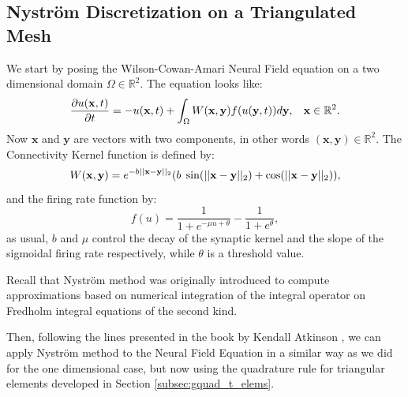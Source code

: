 \documentclass{uonmathreport}
\begin{document}
\subsection{Nystr\"om Discretization on a Triangulated Mesh}
\label{subsec:tri nystrom discretize}

We start by posing the Wilson-Cowan-Amari Neural Field equation on a two dimensional domain $\Omega \in \mathbb{R}^2$. The equation looks like:
\begin{equation} \label{eqn:2d_tri_nf_gral}
\frac{\partial u(\mathbf{x},t)}{\partial t} = - u(\mathbf{x},t) + \int_{\Omega} W(\mathbf{x},\mathbf{y})f(u(\mathbf{y}, t)) d\mathbf{y}, \hspace{3mm} \mathbf{x} \in \mathbb{R}^2.
\end{equation}
Now $\mathbf{x}$ and $\mathbf{y}$ are vectors with two components, in other words $(\mathbf{x}, \mathbf{y}) \in \mathbb{R}^2$.
The Connectivity Kernel function is defined by:
\begin{equation}\label{eqn:2d_tri_kernel}
W(\mathbf{x},\mathbf{y})  = e^{-b||\mathbf{x}-\mathbf{y}||_2}(b\hspace{1mm} \sin(||\mathbf{x}-\mathbf{y}||_2) + \cos(||\mathbf{x}-\mathbf{y}||_2)),
\end{equation}
and the firing rate function by:
\begin{equation}\label{eqn:2d_tri_frate}
f(u) = \frac{1}{1+e^{-\mu u + \theta}} -\frac{1}{1+e^\theta},
\end{equation}
as usual, $b$ and $\mu$ control the decay of the synaptic kernel and the slope of the sigmoidal firing rate respectively, while $\theta$ is a threshold value. 

Recall that Nystr\"om method was originally introduced to compute approximations based on numerical integration of the integral operator on Fredholm integral equations of the second kind.

Then, following the lines presented in the book by Kendall Atkinson \cite{atkinson1976survey}, we can apply Nystr\"om method to the Neural Field Equation in a similar way as we did for the one dimensional case, but now using the quadrature rule for triangular elements developed in Section \ref{subsec:gquad_t_elems}.
\end{document}
